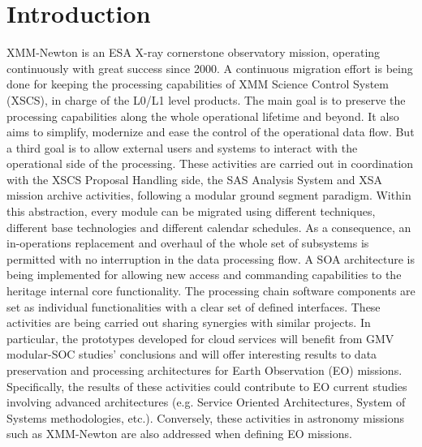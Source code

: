 \section{Introduction}
XMM-Newton is an ESA X-ray cornerstone observatory mission, operating continuously with great success since 2000. A continuous migration effort is being done for keeping the processing capabilities of XMM Science Control System (XSCS), in charge of the L0/L1 level products. The main goal is to preserve the processing capabilities along the whole operational lifetime and beyond. It also aims to simplify, modernize and ease the control of the operational data flow. But a third goal is to allow external users and systems to interact with the operational side of the processing. These activities are carried out in coordination with the XSCS Proposal Handling side, the SAS Analysis System and XSA mission archive activities, following a modular ground segment paradigm. Within this abstraction, every module can be migrated using different techniques, different base technologies and different calendar schedules. As a consequence, an in-operations replacement and overhaul of the whole set of subsystems is permitted with no interruption in the data processing flow. A SOA architecture is being implemented for allowing new access and commanding capabilities to the heritage internal core functionality. The processing chain software components are set as individual functionalities with a clear set of defined interfaces. These activities are being carried out sharing synergies with similar projects. In particular, the prototypes developed for cloud services will benefit from GMV modular-SOC studies' conclusions and will offer interesting results to data preservation and processing architectures for Earth Observation (EO) missions. Specifically, the results of these activities could contribute to EO  current studies involving advanced architectures (e.g. Service Oriented Architectures, System of Systems methodologies, etc.). Conversely, these activities in astronomy missions such as XMM-Newton are also addressed when defining EO missions.

